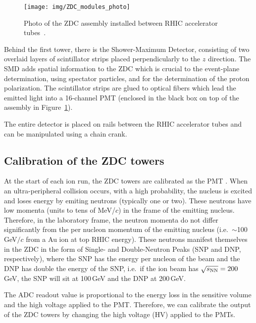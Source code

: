 \begin{figure}[!htb]
\begin{center}
  \texttt{[image: img/ZDC\_modules\_photo]}
\end{center}
\caption{\label{ZDC_photo}Photo of the ZDC assembly installed between RHIC accelerator tubes~\cite{ZDCSMD}. }
\end{figure}

Behind the first tower, there is the Shower-Maximum Detector, consisting of two overlaid layers of scintillator strips placed perpendicularly to the $z$ direction. The SMD adds spatial information to the ZDC which is crucial to the event-plane determination, using spectator particles, and for the determination of the proton polarization\@. The scintillator strips are glued to optical fibers which lead the emitted light into a 16-channel PMT (enclosed in the black box on top of the assembly in Figure~\ref{ZDC_photo})\@.

The entire detector is placed on rails between the RHIC accelerator tubes and can be manipulated using a chain crank.

\subsection{Calibration of the ZDC towers\label{ZDCcalibration}}
At the start of each ion run, the ZDC towers are calibrated as the PMT . When an ultra-peripheral
collision occurs, with a high probability, the nucleus is excited and loses energy by emiting neutrons
(typically one or two). These neutrons have low momenta (units to tens of MeV/$c$) in the frame of the emitting nucleus. Therefore, in the laboratory frame, the neutron momenta do not differ significantly from the per nucleon momentum of the emitting nucleus (i.e.\ $\sim$100$\,$GeV$/c$ from a Au ion at top RHIC energy). These neutrons manifest themselves in the ZDC in the form of Single- and Double-Neutron Peaks
(SNP and DNP, respectively),
where the SNP has the energy per nucleon of the beam and the DNP has double the energy of the SNP, i.e.\ if
the ion beam has $\sqrt{s_\text{NN}} = 200\,$GeV, the SNP will sit at 100$\,$GeV and the DNP at 200$\,$GeV\@.

The ADC readout value is proportional to the energy loss in the sensitive volume and the high voltage applied to the PMT\@. Therefore, we can calibrate the output of the ZDC towers by changing the high voltage (HV) applied to the PMTs. 

